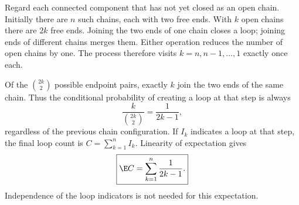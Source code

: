 Regard each connected component that has not yet closed as an open chain. Initially there are $n$ such chains, each with two free ends. With $k$ open chains there are $2k$ free ends. Joining the two ends of one chain closes a loop; joining ends of different chains merges them. Either operation reduces the number of open chains by one. The process therefore visits $k=n,n-1,\ldots,1$ exactly once each.

Of the $\binom{2k}{2}$ possible endpoint pairs, exactly $k$ join the two ends of the same chain. Thus the conditional probability of creating a loop at that step is always
\[
\frac{k}{\binom{2k}{2}}=\frac1{2k-1},
\]
regardless of the previous chain configuration. If $I_k$ indicates a loop at that step, the final loop count is $C=\sum_{k=1}^nI_k$. Linearity of expectation gives
\[
\boxed{\E C=\sum_{k=1}^n\frac1{2k-1}.}
\]
Independence of the loop indicators is not needed for this expectation.
